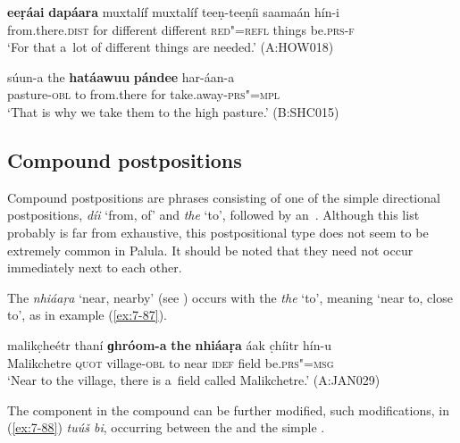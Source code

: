 \begin{exe}
\begin{exe}
\ex
\label{ex:7-85}
\gll \textbf{eeṛáai} \textbf{dapáara} muxtalíf muxtalíf teeṇ-teeṇíi saamaán hín-i \\
from.there.\textsc{dist} for different different \textsc{red"=refl}  things be.\textsc{prs-f}  \\
\glt `For that a~lot of different things are needed.' (A:HOW018)
\end{exe}
\begin{exe}
\ex
\label{ex:7-86}
\gll súun-a the \textbf{hatáawuu} \textbf{pándee} har-áan-a \\
pasture-\textsc{obl} to from.there for take.away-\textsc{prs"=mpl} \\
\glt `That is why we take them to the high pasture.' (B:SHC015)
\end{exe}


\subsection{Compound postpositions}
\label{subsec:7-2-3}

Compound postpositions are phrases consisting of one of the simple directional postpositions, \textit{díi} `from, of' and \textit{the} `to', followed by an~. Although this list probably is far from exhaustive, this postpositional type does not seem to be extremely common in Palula. It should be noted that they need not occur immediately next to each other.


The  \textit{nhiáaṛa} `near, nearby' (see ) occurs with the  \textit{the} `to', meaning `near to, close to', as in example (\ref{ex:7-87}). 

\begin{exe}
\ex
\label{ex:7-87}
\gll malikc̣heétr thaní \textbf{ɡhróom-a} \textbf{the} \textbf{nhiáaṛa} áak c̣híitr hín-u \\
Malikchetre \textsc{quot} village-\textsc{obl} to near \textsc{idef} field be.\textsc{prs"=msg} \\
\glt `Near to the village, there is a~field called Malikchetre.' (A:JAN029)
\end{exe}

The  component in the compound can be further modified, such modifications, in (\ref{ex:7-88}) \textit{tuúš bi}, occurring between the  and the simple .


\end{exe}
